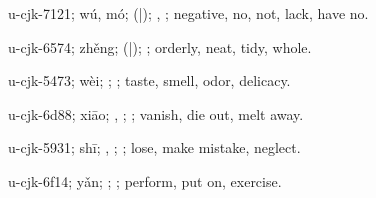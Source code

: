 \begin{multicols}{2}
{\cjkgGlue{}u-cjk-7121; wú, mó; \cjkgGlue{}\cjkgGlue{}(\cjkgGlue{}|\cjkgGlue{}); \cjkgGlue{}, \cjkgGlue{}; negative, no, not, lack, have no.

\cjkgGlue{}u-cjk-6574; zhěng; \cjkgGlue{}\cjkgGlue{}(\cjkgGlue{}|\cjkgGlue{}); \cjkgGlue{}; orderly, neat, tidy, whole.

\cjkgGlue{}u-cjk-5473; wèi; \cjkgGlue{}\cjkgGlue{}\cjkgGlue{}; \cjkgGlue{}; taste, smell, odor, delicacy.

\cjkgGlue{}u-cjk-6d88; xiāo; \cjkgGlue{}\cjkgGlue{}\cjkgGlue{}, \cjkgGlue{}\cjkgGlue{}\cjkgGlue{}; \cjkgGlue{}; vanish, die out, melt away.

\cjkgGlue{}u-cjk-5931; shī; \cjkgGlue{}\cjkgGlue{}\cjkgGlue{}, \cjkgGlue{}\cjkgGlue{}\cjkgGlue{}; \cjkgGlue{}; lose, make mistake, neglect.

\cjkgGlue{}u-cjk-6f14; yǎn; \cjkgGlue{}; \cjkgGlue{}; perform, put on, exercise.

}
\end{multicols}

